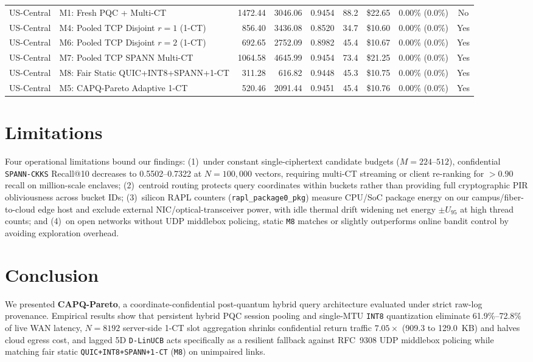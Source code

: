 \documentclass[10pt,journal,compsoc]{IEEEtran}
\begin{document}
\begin{table}[!t]
\begin{adjustbox}{max width=\textwidth}
\begin{tabular}{llrrrrrrc}
\midrule
US-Central & M1: Fresh PQC + Multi-CT & 1472.44 & 3046.06 & 0.9454 & 88.2 & \$22.65 & 0.00\% (0.0\%) & No \\
US-Central & M4: Pooled TCP Disjoint $r=1$ (1-CT) & 856.40 & 3436.08 & 0.8520 & 34.7 & \$10.60 & 0.00\% (0.0\%) & Yes \\
US-Central & M6: Pooled TCP Disjoint $r=2$ (1-CT) & 692.65 & 2752.09 & 0.8982 & 45.4 & \$10.67 & 0.00\% (0.0\%) & Yes \\
US-Central & M7: Pooled TCP SPANN Multi-CT & 1064.58 & 4645.99 & 0.9454 & 73.4 & \$21.25 & 0.00\% (0.0\%) & Yes \\
US-Central & M8: Fair Static QUIC+INT8+SPANN+1-CT & 311.28 & 616.82 & 0.9448 & 45.3 & \$10.75 & 0.00\% (0.0\%) & Yes \\
US-Central & M5: CAPQ-Pareto Adaptive 1-CT & 520.46 & 2091.44 & 0.9451 & 45.4 & \$10.76 & 0.00\% (0.0\%) & Yes \\
\bottomrule
\end{tabular}
\end{adjustbox}
\end{table}

\section{Limitations}
Four operational limitations bound our findings: (1)~under constant single-ciphertext candidate budgets ($M=224$--$512$), confidential \texttt{SPANN-CKKS} Recall@10 decreases to 0.5502--0.7322 at $N=100,000$ vectors, requiring multi-CT streaming or client re-ranking for $>0.90$ recall on million-scale enclaves; (2)~centroid routing protects query coordinates within buckets rather than providing full cryptographic PIR obliviousness across bucket IDs; (3)~silicon RAPL counters (\nolinkurl{rapl_package0_pkg}) measure CPU/SoC package energy on our campus/fiber-to-cloud edge host and exclude external NIC/optical-transceiver power, with idle thermal drift widening net energy $\pm U_{95}$ at high thread counts; and (4)~on open networks without UDP middlebox policing, static \texttt{M8} matches or slightly outperforms online bandit control by avoiding exploration overhead.

\section{Conclusion}
We presented \textbf{CAPQ-Pareto}, a coordinate-confidential post-quantum hybrid query architecture evaluated under strict raw-log provenance. Empirical results show that persistent hybrid PQC session pooling and single-MTU \texttt{INT8} quantization eliminate 61.9\%--72.8\% of live WAN latency, $N=8192$ server-side 1-CT slot aggregation shrinks confidential return traffic $7.05\times$ (909.3 to 129.0~KB) and halves cloud egress cost, and lagged 5D \texttt{D-LinUCB} acts specifically as a resilient fallback against RFC~9308 UDP middlebox policing while matching fair static \texttt{QUIC+INT8+SPANN+1-CT} (\texttt{M8}) on unimpaired links.
\end{document}
